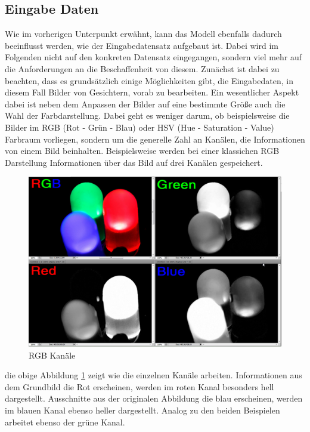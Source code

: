 \documentclass[12pt, a4paper]{report}
\newcommand*\setcaptioncitation[1]{\def\captioncitation{\textit{Quelle:}~#1}}
\let\captioncitation\relax
\begin{document}
\subsection{Eingabe Daten}
\label{subsec: Eingabe Daten}
Wie im vorherigen Unterpunkt erwähnt, kann das Modell ebenfalls dadurch beeinflusst werden, wie der Eingabedatensatz aufgebaut ist. Dabei wird im Folgenden nicht auf den konkreten Datensatz eingegangen, sondern viel mehr auf die Anforderungen an die Beschaffenheit von diesem. Zunächst ist dabei zu beachten, dass es grundsätzlich einige Möglichkeiten gibt, die Eingabedaten, in diesem Fall Bilder von Gesichtern, vorab zu bearbeiten. Ein wesentlicher Aspekt dabei ist neben dem Anpassen der Bilder auf eine bestimmte Größe auch die Wahl der Farbdarstellung. Dabei geht es weniger darum, ob beispielsweise die Bilder im RGB (Rot - Grün - Blau) oder HSV (Hue - Saturation - Value) Farbraum vorliegen, sondern um die generelle Zahl an Kanälen, die Informationen von einem Bild beinhalten. Beispielsweise werden bei einer klassichen RGB Darstellung Informationen über das Bild auf drei Kanälen gespeichert. 
\begin{figure}[h]
\includegraphics[width=\linewidth]{Bilder/RGB.png}
\setcaptioncitation{ https://www.howtogeek.com/wp-content/uploads/2011/02/sshot-74.png}
\caption{RGB Kanäle}
\label{fig: RGB}
\end{figure}
die obige Abbildung \ref{fig: RGB} zeigt wie die einzelnen Kanäle arbeiten. Informationen aus dem Grundbild die Rot erscheinen, werden im roten Kanal besonders hell dargestellt. 
Ausschnitte aus der originalen Abbildung die blau erscheinen, werden im blauen Kanal ebenso heller dargestellt. Analog zu den beiden Beispielen arbeitet ebenso der grüne Kanal.
\end{document}

